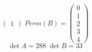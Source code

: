 \documentclass[a4paper, 12pt]{article}
\begin{document}
\begin{exercici}
\begin{enumerate}[label=\alph*)]
\begin{solucio}
$$\begin{pmatrix}
                    1
                \end{pmatrix}\;
                Perm(B) =
                \begin{pmatrix}
                    0\\
                    1\\
                    2\\
                    3\\
                    4
                \end{pmatrix}
                $$
                $$
                \det A = 288\; \det B = 33
                $$
            \end{solucio}
        \end{enumerate}
    \end{exercici}
\end{document}
